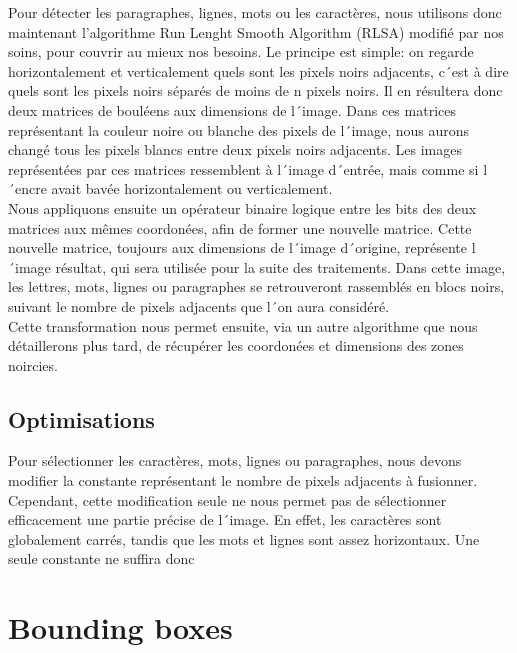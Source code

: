 Pour détecter les paragraphes, lignes, mots ou les caractères, nous utilisons donc maintenant l'algorithme Run Lenght Smooth Algorithm (RLSA) modifié par nos soins, pour couvrir au mieux nos besoins. Le principe est simple: on regarde horizontalement et verticalement quels sont les pixels noirs adjacents, c´est à dire quels sont les pixels noirs séparés de moins de n pixels noirs. Il en résultera donc deux matrices de bouléens aux dimensions de l´image. Dans ces matrices représentant la couleur noire ou blanche des pixels de l´image, nous aurons changé tous les pixels blancs entre deux pixels noirs adjacents. Les images représentées par ces matrices ressemblent à l´image d´entrée, mais comme si l´encre avait bavée horizontalement ou verticalement.\\
Nous appliquons ensuite un opérateur binaire logique entre les bits des deux matrices aux mêmes coordonées, afin de former une nouvelle matrice. Cette nouvelle matrice, toujours aux dimensions de l´image d´origine, représente l´image résultat, qui sera utilisée pour la suite des traitements. Dans cette image, les lettres, mots, lignes ou paragraphes se retrouveront rassemblés en blocs noirs, suivant le nombre de pixels adjacents que l´on aura considéré.\\
Cette transformation nous permet ensuite, via un autre algorithme que nous détaillerons plus tard, de récupérer les coordonées et dimensions des zones noircies.

\subsection{Optimisations}

Pour sélectionner les caractères, mots, lignes ou paragraphes, nous devons modifier la constante représentant le nombre de pixels adjacents à fusionner. Cependant, cette modification seule ne nous permet pas de sélectionner efficacement une partie précise de l´image. En effet, les caractères sont globalement carrés, tandis que les mots et lignes sont assez horizontaux. Une seule constante ne suffira donc

\section{Bounding boxes}

\begin{center}
\end{center}

\begin{center}
\end{center}


